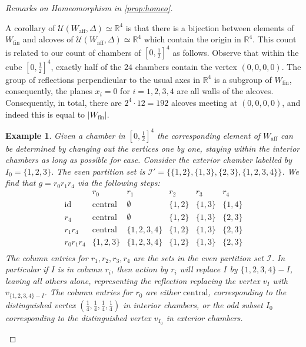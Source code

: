 \documentclass[12pt,letterpaper,reqno]{amsart}
\newtheorem{ex}[thm]{Example}
\theoremstyle{remark}
\theoremstyle{definition}
\numberwithin{thm}{section}
\numberwithin{equation}{section}
\numberwithin{figure}{section}
\newcommand{\R}{\ensuremath{\mathbb R}}
\newcommand{\Simplex}{\Delta}
\begin{document}
\begin{proof}[Remarks on Homeomorphism in \ref{prop:homeo}]
\begin{itemize}
 A corollary of $\mathcal{U}(W_{\mathrm{aff}}, \Simplex) \simeq \R^4$ is that 
there is a bijection between elements of $W_{\mathrm{fin}}$ and alcoves of $\mathcal{U}(W_{\mathrm{aff}}, \Simplex) \simeq \R^4$ which contain the origin in $\R^4$. 
This count is related to our count of chambers of $[0, \frac{1}{2}]^4$ as follows. Observe that within the cube $[0, \frac{1}{2}]^4$, exactly half of the $24$ chambers contain the vertex $(0, 0, 0, 0)$. 
 The group of reflections perpendicular to the usual axes in $\R^4$ is a subgroup of $W_{\mathrm{fin}}$, consequently, the planes $x_i=0$ for $i=1, 2, 3, 4$ are all walls of the alcoves. 
Consequently, in total, there are $2^4 \cdot 12=192$ alcoves meeting at $(0,0, 0, 0)$, and indeed this is equal to $|W_{\mathrm{fin}}|$.
\end{itemize}
\begin{ex}\label{ex:action}
  Given a chamber in $[0, \frac{1}{2}]^4$ the corresponding element of $W_{\mathrm{aff}}$ can be determined by changing out the vertices one by one, staying within the interior chambers as long as possible for ease. Consider the exterior chamber labelled by $I_0=\{1, 2, 3\}$. The even partition set is $\mathcal{I}'=\{\{1, 2\}, \{1, 3\}, \{2,3\}, \{1, 2, 3,4\}\}$.
We find that $g= r_0 r_1 r_4$ via the following steps: 
\[
\begin{array}{c|ccccc}
  & r_0 & r_1 & r_2 & r_3 & r_4 \\
  \hline
 \mathrm{id} & \mathrm{central}  &\emptyset & \{1, 2\} & \{1, 3\} & \{1, 4\}  \\
  r_4 & \mathrm{central} & \emptyset &  \{1, 2\} & \{1, 3\} & \{2, 3\}  \\  
  r_1r_4 & \mathrm{central} &
  \{1, 2, 3, 4\} & \{1, 2\} & \{1, 3\} & \{2, 3\}  \\
    r_0r_1r_4 & \{1, 2, 3\}  &
  \{1, 2, 3, 4\}  & \{1, 2\} & \{1, 3\} & \{2, 3\}  \\
\end{array}
\]
The column entries for $r_1, r_2, r_3, r_4$ are the sets in the even partition set $\mathcal{I}$. In particular if $I$ is in column $r_i$, then action by $r_i$ will replace $I$ by $\{1, 2, 3, 4\}-I$, leaving all others alone, representing the reflection replacing the vertex $v_I$ with $v_{\{1, 2, 3, 4\} - I}$. The column entries for $r_0$ are either $\mathrm{central}$,  corresponding to the distinguished vertex $(\frac{1}{4}, \frac{1}{4}, \frac{1}{4}, \frac{1}{4})$ in interior chambers, or the odd subset $I_0$ corresponding to the distinguished vertex $v_{I_0}$ in exterior chambers.
\end{ex}
\end{proof}
\end{document}
